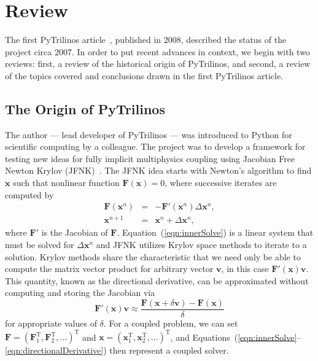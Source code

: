 \documentclass[11pt]{article}
\begin{document}
\section{Review}
\label{sec:review}

The first PyTrilinos article~\cite{PyTrilinos}, published in 2008, described the status of the project circa 2007.  In order to put recent advances in context, we begin with two reviews: first, a review of the historical origin of PyTrilinos, and second, a review of the topics covered and conclusions drawn in the first PyTrilinos article.

\subsection{The Origin of PyTrilinos}
\label{sec:origin}

The author --- lead developer of PyTrilinos --- was introduced to Python for scientific computing by a colleague.  The project was to develop a framework for testing new ideas for fully implicit multiphysics coupling using Jacobian Free Newton Krylov (JFNK)~\cite{JFNK}.  The JFNK idea starts with Newton's algorithm to find $\mathbf x$ such that nonlinear function $\mathbf F(\mathbf x) = 0$, where successive iterates are computed by
\begin{eqnarray}
  \label{eqn:innerSolve}
  \mathbf F(\mathbf x^n) & = & -\mathbf F'(\mathbf x^n) \Delta\mathbf x^n , \\
  \mathbf x^{n+1} & = & \mathbf x^n + \Delta\mathbf x^n,
\end{eqnarray}
where $\mathbf F'$ is the Jacobian of $\mathbf F$.  Equation~(\ref{eqn:innerSolve}) is a linear system that must be solved for $\Delta\mathbf x^n$ and JFNK utilizes Krylov space methods to iterate to a solution.  Krylov methods share the characteristic that we need only be able to compute  the matrix vector product for arbitrary vector $\mathbf v$, in this case $\mathbf F'(\mathbf x) \mathbf v$.  This quantity, known as the directional derivative, can be approximated without computing and storing the Jacobian via
\begin{equation}
  \label{eqn:directionalDerivative}
  \mathbf F'(\mathbf x) \mathbf v \approx \frac{\mathbf F(\mathbf x + \delta\mathbf v) - \mathbf F(\mathbf x)}{\delta}
\end{equation}
for appropriate values of $\delta$.  For a coupled problem, we can set $\mathbf F = (\mathbf F_1^\mathrm{T}, \mathbf F_2^\mathrm{T}, \ldots)^\mathrm{T}$ and $\mathbf x = (\mathbf x_1^\mathrm{T}, \mathbf x_2^\mathrm{T}, \ldots)^\mathrm{T}$, and Equations~(\ref{eqn:innerSolve}--\ref{eqn:directionalDerivative}) then represent a coupled solver.
\end{document}
